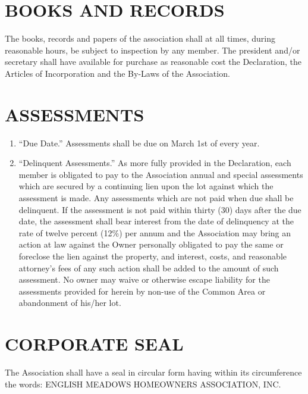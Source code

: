 \documentclass[10pt, letterpaper]{article}
\begin{document}
\section{BOOKS AND RECORDS}
The books, records and papers of the association shall at all times, during reasonable hours, be subject to inspection by any member.
The president and/or secretary shall have available for purchase as reasonable cost the Declaration, the Articles of Incorporation and the By-Laws of the Association.

\section{ASSESSMENTS}
\begin{enumerate}
  \item ``Due Date.''
    Assessments shall be due on March 1st of every year.
  \item ``Delinquent Assessments.''
    As more fully provided in the Declaration, each member is obligated to pay to the Association annual and special assessments which are secured by a continuing lien upon the lot against which the assessment is made.
    Any assessments which are not paid when due shall be delinquent.
    If the assessment is not paid within thirty (30) days after the due date, the assessment shall bear interest from the date of delinquency at the rate of twelve percent (12\%) per annum and the Association may bring an action at law against the Owner personally obligated to pay the same or foreclose the lien against the property, and interest, costs, and reasonable attorney's fees of any such action shall be added to the amount of such assessment.  No owner may waive or otherwise escape liability for the assessments provided for herein by non-use of the Common Area or abandonment of his/her lot.
\end{enumerate}

\section{CORPORATE SEAL}
The Association shall have a seal in circular form having within its circumference the words:
ENGLISH MEADOWS HOMEOWNERS ASSOCIATION, INC.
\end{document}
